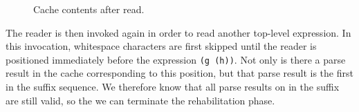 \begin{figure}
\begin{center}
\end{center}
\caption{\label{fig-after-read}
Cache contents after read.}
\end{figure}

The reader is then invoked again in order to read another top-level
expression.  In this invocation, whitespace characters are first
skipped until the reader is positioned immediately before the
expression \texttt{(g (h))}.  Not only is there a parse result in the
cache corresponding to this position, but that parse result is the
first in the suffix sequence.  We therefore know that all parse
results on in the suffix are still valid, so the we can terminate the
rehabilitation phase.
